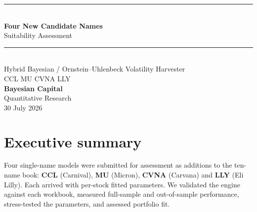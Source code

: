 \documentclass[11pt]{article}
\begin{document}
\begin{titlepage}
\vspace*{1.2cm}
{\color{bcgold}\rule{\textwidth}{2pt}}\\[0.4cm]
{\color{bcnavy}\Huge\bfseries Four New Candidate Names}\\[0.35cm]
{\color{bcblue}\LARGE Suitability Assessment}\\[0.5cm]
{\color{bcgold}\rule{\textwidth}{1pt}}\\[0.6cm]
{\large\color{bcgrey} Hybrid Bayesian / Ornstein--Uhlenbeck Volatility Harvester}\\[0.2cm]
{\large\color{bcgrey} CCL \quad MU \quad CVNA \quad LLY}\\[1.2cm]
{\color{bcnavy}\large\bfseries Bayesian Capital}\\[0.15cm]
{\color{bcgrey} Quantitative Research}\\[0.15cm]
{\color{bcgrey} 30 July 2026}\\[2cm]

\end{titlepage}

\section{Executive summary}

Four single-name models were submitted for assessment as additions to the ten-name book:
\textbf{CCL} (Carnival), \textbf{MU} (Micron), \textbf{CVNA} (Carvana) and \textbf{LLY} (Eli
Lilly). Each arrived with per-stock fitted parameters. We validated the engine against each
workbook, measured full-sample and out-of-sample performance, stress-tested the parameters, and
assessed portfolio fit.
\end{document}
